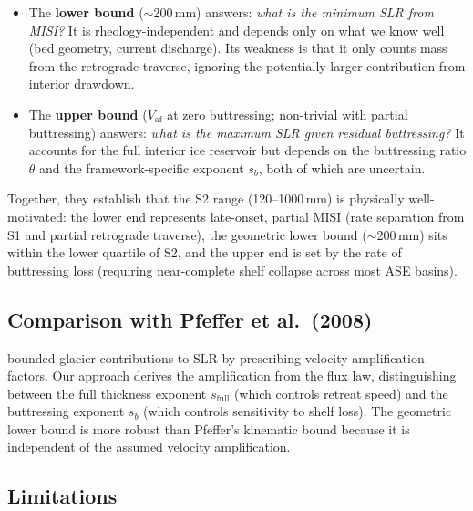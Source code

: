 \documentclass[11pt]{article}
\newcommand{\Vaf}{V_{\mathrm{af}}}
\begin{document}
\begin{itemize}
	\item The \textbf{lower bound} ($\sim$200\,mm) answers: \emph{what is the minimum SLR from MISI?} It is rheology-independent and depends only on what we know well (bed geometry, current discharge). Its weakness is that it only counts mass from the retrograde traverse, ignoring the potentially larger contribution from interior drawdown.

	\item The \textbf{upper bound} ($\Vaf$ at zero buttressing; non-trivial with partial buttressing) answers: \emph{what is the maximum SLR given residual buttressing?} It accounts for the full interior ice reservoir but depends on the buttressing ratio $\theta$ and the framework-specific exponent $s_b$, both of which are uncertain.
\end{itemize}

Together, they establish that the S2 range (120--1000\,mm) is physically well-motivated: the lower end represents late-onset, partial MISI (rate separation from S1 and partial retrograde traverse), the geometric lower bound ($\sim$200\,mm) sits within the lower quartile of S2, and the upper end is set by the rate of buttressing loss (requiring near-complete shelf collapse across most ASE basins).

\subsection{Comparison with Pfeffer et al.\ (2008)}

\citet{Pfeffer2008} bounded glacier contributions to SLR by prescribing velocity amplification factors. Our approach derives the amplification from the flux law, distinguishing between the full thickness exponent $s_{\mathrm{full}}$ (which controls retreat speed) and the buttressing exponent $s_b$ (which controls sensitivity to shelf loss). The geometric lower bound is more robust than Pfeffer's kinematic bound because it is independent of the assumed velocity amplification.

\subsection{Limitations}
\end{document}
